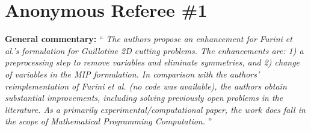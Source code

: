 \documentclass[smallextended]{svjour3}       %
\begin{document}
\section{Anonymous Referee \#1}

\textbf{General commentary:} ``{\itshape
The authors propose an enhancement for Furini et al.'s formulation for Guillotine 2D cutting problems. The enhancements are: 1) a preprocessing step to remove variables and eliminate symmetries, and 2) change of variables in the MIP formulation. In comparison with the authors' reimplementation of Furini et al. (no code was available), the authors obtain substantial improvements, including solving previously open problems in the literature. As a primarily experimental/computational paper, the work does fall in the scope of Mathematical Programming Computation.
}''

\bigskip
\end{document}
